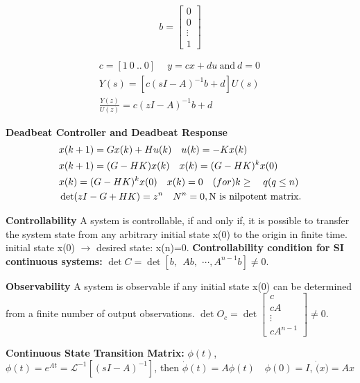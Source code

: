 \begin{multicols*}{3}
\vspace*{-0.90cm}

\begin{minipage}[h]{0.25\linewidth}
\[
b = \begin{bmatrix}
0 \\
0 \\
\vdots \\
1
\end{bmatrix}
\]
\end{minipage}
\begin{minipage}[h]{0.75\linewidth}
\begin{align*}
& c = [1 \ 0 \ .. \ 0] \ \quad y =cx+du \ \text{and} \ d=0 \\
& Y(s) = [c(sI-A)^{-1}b+d]U(s) \quad \\ 
& \frac{Y(z)}{U(z)} = c(zI-A)^{-1}b+d 
\end{align*}
\end{minipage}
\textbf{Deadbeat Controller and Deadbeat Response}
\vspace*{-0.25cm}
\begin{align*}
& x(k+1)=Gx(k)+Hu(k) \quad u(k)=-Kx(k) \\
& x(k+1)=(G-HK)x(k) \quad x(k)=(G-HK)^kx(0) \\
& x(k) = (G-HK)^kx(0) \quad x(k) =0 \quad \text(for) k \geq \quad q (q \leq n) \\
& \det(zI-G+HK)=z^n \quad N^n =0, \text{N is nilpotent matrix.}
\end{align*}
\vspace*{-0.7cm}

\textbf{Controllability} A system is controllable, if and only if, it is possible to transfer the system state from any arbitrary initial state x(0) to the origin in finite time. initial state x(0) $\rightarrow$ desired state: x(n)=0.%
%
\textbf{Controllability condition for SI continuous systems:} $\det C = \det[b, \ \ Ab, \ \, \cdots, A^{n-1}b] \neq 0$.

\textbf{Observability} A system is observable if any initial state x(0) can be determined from a finite number of output observations. $\det O_c = \det \begin{bmatrix} 
c \\ cA \\ \vdots \\ cA^{n-1} \end{bmatrix} \neq 0$.

\textbf{Continuous State Transition Matrix:} $\phi(t)$,
$\phi(t)=e^{At}= \mathcal{L}^{-1}[(sI-A)^{-1}]$, then $\dot{\phi}(t)=A\phi(t) \quad \phi(0)=I$, $\dot(x)=Ax$ %


\end{multicols*}
